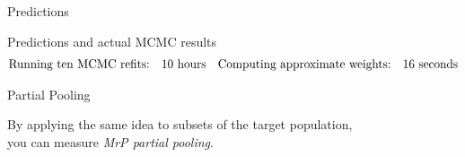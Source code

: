 \begin{frame}[t]{Predictions}
    \AlexanderPredictionFigOne{}
\end{frame}


\begin{frame}[t]{Predictions and actual MCMC results}
    \AlexanderPredictionFigTwo{}
    \vspace{-3em}
    $$
    \begin{aligned}
        \textrm{Running ten MCMC refits:}\quad & 10 \textrm{ hours} &
        \textrm{Computing approximate weights:}\quad &16 \textrm{ seconds}\\
    \end{aligned}
    $$
\end{frame}



\begin{frame}[t]{Partial Pooling}

\centering
By applying the same idea to subsets of the target population, \\you can measure
\emph{MrP partial pooling}.\\[3em]
\wholeslidefig{
\PartialPoolingPlot{}
}
\end{frame}









